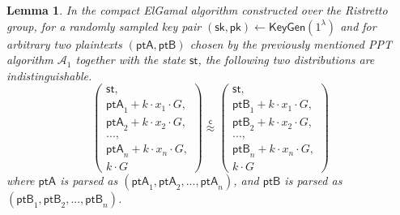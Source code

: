 \documentclass{article}
\newtheorem{lemma}{Lemma}
\begin{document}
\begin{lemma} In the compact ElGamal algorithm constructed over the Ristretto group, for a randomly sampled key pair $(\mathsf{sk},\mathsf{pk})\leftarrow\mathsf{KeyGen}(1^\lambda)$ and for arbitrary two plaintexts $(\mathsf{ptA},\mathsf{ptB})$ chosen by the previously mentioned PPT algorithm $\mathcal{A}_1$ together with the state $\mathsf{st}$, the following two distributions are indistinguishable.
\[
\left(\begin{array}{r}
\mathsf{st},\\
\mathsf{ptA}_1+k\cdot x_1\cdot G,\\
\mathsf{ptA}_2+k\cdot x_2\cdot G,\\
...,\\
\mathsf{ptA}_n+k\cdot x_n\cdot G,\\
k\cdot G
\end{array}
\right)\stackrel{\mathsf{c}}{\approx}\left(\begin{array}{l}
\mathsf{st},\\
\mathsf{ptB}_1+k\cdot x_1\cdot G,\\
\mathsf{ptB}_2+k\cdot x_2\cdot G,\\
...,\\
\mathsf{ptB}_n+k\cdot x_n\cdot G,\\
k\cdot G
\end{array}
\right)
\]
where $\mathsf{ptA}$ is parsed as $(\mathsf{ptA}_1, \mathsf{ptA}_2, ..., \mathsf{ptA}_n)$, and $\mathsf{ptB}$ is parsed as $(\mathsf{ptB}_1, \mathsf{ptB}_2, ..., \mathsf{ptB}_n)$.
\end{lemma}
\end{document}
